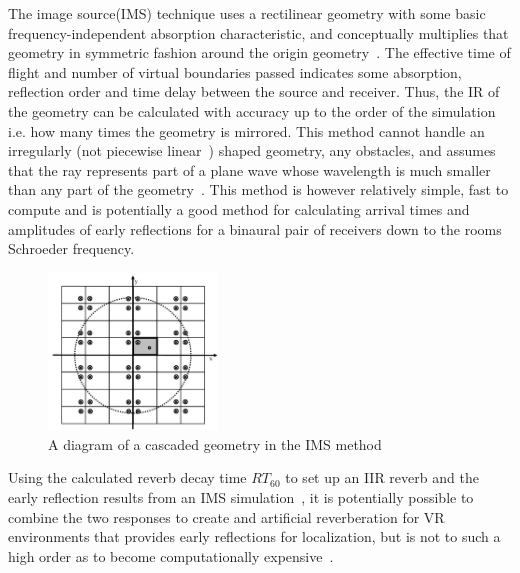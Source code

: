 \documentclass[paper=a4, fontsize=10pt, font=arial]{scrartcl} %
\numberwithin{equation}{section} %
\numberwithin{figure}{section} %
\numberwithin{table}{section} %
\begin{document}
The image source(IMS) technique uses a rectilinear geometry with some basic frequency-independent absorption characteristic, and conceptually multiplies that geometry in symmetric fashion around the origin geometry~\cite{Allen1979}. The effective time of flight and number of virtual boundaries passed indicates some absorption, reflection order and time delay between the source and receiver. Thus, the IR of the geometry can be calculated with accuracy up to the order of the simulation i.e. how many times the geometry is mirrored. This method cannot handle an irregularly (not piecewise linear~\cite{Borish1984}) shaped geometry, any obstacles, and assumes that the ray represents part of a plane wave whose wavelength is much smaller than any part of the geometry~\cite{Elorza2005}. This method is however relatively simple, fast to compute and is potentially a good method for calculating arrival times and amplitudes of early reflections for a binaural pair of receivers down to the rooms Schroeder frequency.

\begin{figure}[H]
\centering
\includegraphics[width=0.4\textwidth]{imagesourcediagram.jpg}
\caption{A diagram of a cascaded geometry in the IMS method\cite{Hill2012}}
\end{figure}

Using the calculated reverb decay time $RT_{60}$ to set up an IIR reverb and the early reflection results from an IMS simulation~\cite{Oxnard2012}, it is potentially possible to combine the two responses to create and artificial reverberation for VR environments that provides early reflections for localization, but is not to such a high order as to become computationally expensive~\cite{Lee2010}. \\
\end{document}

